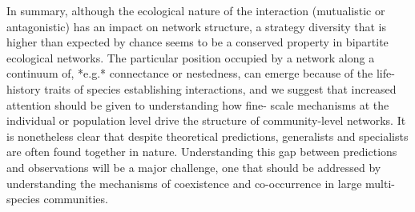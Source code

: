 In summary, although the ecological nature of the interaction (mutualistic
or antagonistic) has an impact on network structure, a strategy diversity
that is higher than expected by chance seems to be a conserved property
in bipartite ecological networks. The particular position occupied by a
network along a continuum of, *e.g.* connectance or nestedness, can emerge
because of the life-history traits of species establishing interactions,
and we suggest that increased attention should be given to understanding
how fine- scale mechanisms at the individual or population level drive the
structure of community-level networks. It is nonetheless clear that despite
theoretical predictions, generalists and specialists are often found together
in nature. Understanding this gap between predictions and observations will
be a major challenge, one that should be addressed by understanding the
mechanisms of coexistence and co-occurrence in large multi-species communities.
